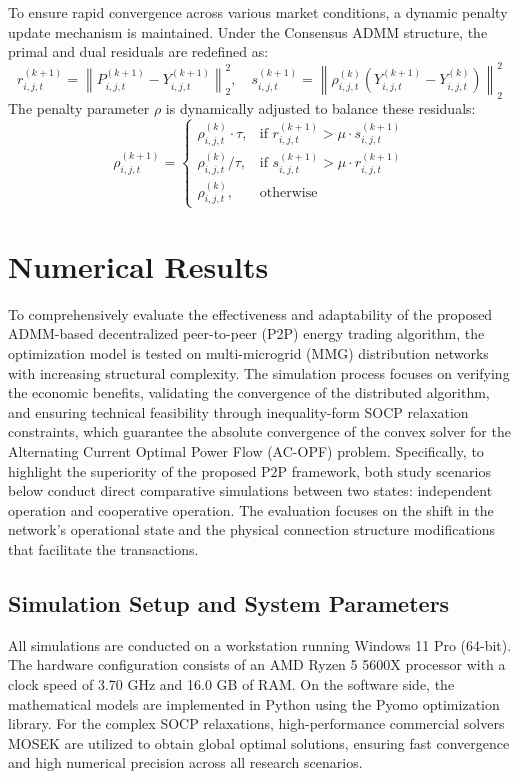 \documentclass[preprint,12pt]{elsarticle}
\begin{document}
\begin{enumerate}
    To ensure rapid convergence across various market conditions, a dynamic penalty update mechanism is maintained. Under the Consensus ADMM structure, the primal and dual residuals are redefined as:
    \begin{equation}
    r_{i,j,t}^{(k+1)} = \left\| P_{i,j,t}^{(k+1)} - Y_{i,j,t}^{(k+1)} \right\|_2^2, \quad s_{i,j,t}^{(k+1)} = \left\| \rho_{i,j,t}^{(k)} \left( Y_{i,j,t}^{(k+1)} - Y_{i,j,t}^{(k)} \right) \right\|_2^2 \label{eq_17}
    \end{equation}
    The penalty parameter $\rho$ is dynamically adjusted to balance these residuals:
    \begin{equation}
    \rho_{i,j,t}^{(k+1)} = 
    \begin{cases} 
    \rho_{i,j,t}^{(k)} \cdot \tau, & \text{if } r_{i,j,t}^{(k+1)} > \mu \cdot s_{i,j,t}^{(k+1)} \\
    \rho_{i,j,t}^{(k)} / \tau, & \text{if } s_{i,j,t}^{(k+1)} > \mu \cdot r_{i,j,t}^{(k+1)} \\
    \rho_{i,j,t}^{(k)}, & \text{otherwise}
    \end{cases} \label{eq_18}
    \end{equation}
\end{enumerate}

\section{Numerical Results}
To comprehensively evaluate the effectiveness and adaptability of the proposed ADMM-based decentralized peer-to-peer (P2P) energy trading algorithm, the optimization model is tested on multi-microgrid (MMG) distribution networks with increasing structural complexity. The simulation process focuses on verifying the economic benefits, validating the convergence of the distributed algorithm, and ensuring technical feasibility through inequality-form SOCP relaxation constraints, which guarantee the absolute convergence of the convex solver for the Alternating Current Optimal Power Flow (AC-OPF) problem.
Specifically, to highlight the superiority of the proposed P2P framework, both study scenarios below conduct direct comparative simulations between two states: independent operation and cooperative operation. The evaluation focuses on the shift in the network's operational state and the physical connection structure modifications that facilitate the transactions.
    \subsection{Simulation Setup and System Parameters}
    All simulations are conducted on a workstation running Windows 11 Pro (64-bit). The hardware configuration consists of an AMD Ryzen 5 5600X processor with a clock speed of 3.70 GHz and 16.0 GB of RAM. On the software side, the mathematical models are implemented in Python using the Pyomo optimization library. For the complex SOCP relaxations, high-performance commercial solvers MOSEK are utilized to obtain global optimal solutions, ensuring fast convergence and high numerical precision across all research scenarios.
\end{document}
